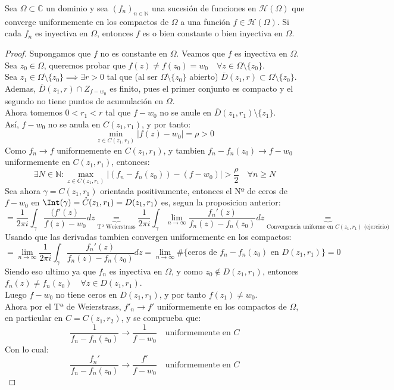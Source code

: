 \begin{teorema}
    Sea $\Omega \subset \mathbb{C}$ un dominio y sea $(f_n)_{n \in \mathbb{N}}$ una sucesión de funciones en $\mathcal{H}(\Omega)$ que converge uniformemente en los compactos de $\Omega$ a una función $f \in \mathcal{H}(\Omega)$. Si cada $f_n$ es inyectiva en $\Omega$, entonces $f$ es o bien constante o bien inyectiva en $\Omega$.
\end{teorema}

\begin{proof}
    Supongamos que $f$ no es constante en $\Omega$. Veamos que $f$ es inyectiva en $\Omega$.\\
    Sea $z_0 \in \Omega$, queremos probar que $f(z) \neq f(z_0) = w_0 \quad \forall z \in \Omega \setminus \{ z_0 \}$.\\
    Sea $z_1 \in \Omega \setminus \{ z_0 \} \implies \exists r > 0$ tal que (al ser $\Omega \setminus \{ z_0 \}$ abierto) $\overline{D}(z_1,r) \subset \Omega \setminus \{ z_0 \}$.\\
    Ademas, $\overline{D}(z_1,r) \cap Z_{f-w_0}$ es finito, pues el primer conjunto es compacto y el segundo no tiene puntos de acumulación en $\Omega$.\\
    Ahora tomemos $0 < r_1 < r$ tal que $f - w_0$ no se anule en $\overline{D}(z_1,r_1) \setminus \{ z_1 \}$.\\
    Así, $f - w_0$ no se anula en $C(z_1,r_1)$, y por tanto:
    \[
    \min_{z \in C(z_1,r_1)} |f(z) - w_0| = \rho > 0
    \]
    Como $f_n \to f$ uniformemente en $C(z_1,r_1)$, y tambien $f_n - f_n(z_0) \to f - w_0$ uniformemente en $C(z_1,r_1)$, entonces:
    \[
    \exists N \in \mathbb{N} :
    \max_{z \in C(z_1,r_1)} |(f_n - f_n(z_0)) - (f - w_0)| > \frac{\rho}{2} \quad \forall n \geq N
    \]
    Sea ahora $\gamma = C(z_1,r_1)$ orientada positivamente, entonces el Nº de ceros de $f - w_0$ en $\Int(\gamma) = \mathring{C}(z_1,r_1) = D(z_1,r_1)$ es, segun la proposicion anterior:
    \[
    = \frac{1}{2 \pi i} \int_\gamma \frac{(f'(z)}{f(z) - w_0} dz \underbrace{=}_{\text{Tª Weierstrass}}
    \frac{1}{2 \pi i} \int_\gamma \lim_{n \to \infty} \frac{f_n'(z)}{f_n(z) - f_n(z_0)} dz \underbrace{=}_{\text{Convergencia uniforme en } C(z_1,r_1) \text{ (ejercicio)}}
    \]
    Usando que las derivadas tambien convergen uniformemente en los compactos:
    \[
    = \lim_{n \to \infty} \frac{1}{2 \pi i} \int_\gamma \frac{f_n'(z)}{f_n(z) - f_n(z_0)} dz =
    \lim_{n \to \infty} \# \{ \text{ceros de } f_n - f_n(z_0) \text{ en } D(z_1,r_1) \} = 0
    \]
    Siendo eso ultimo ya que $f_n$ es inyectiva en $\Omega$, y como $z_0 \notin D(z_1,r_1)$, entonces $f_n(z) \neq f_n(z_0) \quad \forall z \in D(z_1,r_1)$.\\
    Luego $f - w_0$ no tiene ceros en $D(z_1,r_1)$, y por tanto $f(z_1) \neq w_0$.\\
    Ahora por el Tª de Weierstrass, $f'_n \to f'$ uniformemente en los compactos de $\Omega$, en particular en $C=C(z_1,r_2)$, y se comprueba que:
    \[
    \frac{1}{f_n - f_n(z_0)} \to \frac{1}{f - w_0} \quad \text{uniformemente en } C
    \]
    Con lo cual:
    \[
    \frac{f_n'}{f_n - f_n(z_0)} \to \frac{f'}{f - w_0} \quad \text{uniformemente en } C
    \]
\end{proof}